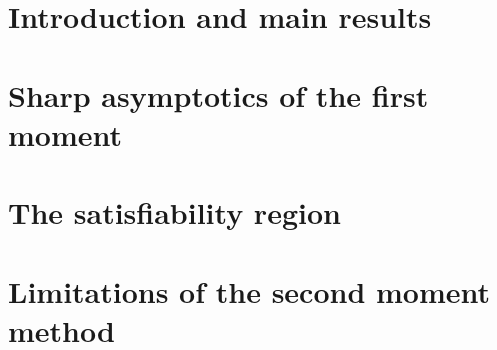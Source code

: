 \documentclass[letterpaper,11pt]{article}
\begin{document}
\setcounter{tocdepth}{2}
\tableofcontents

\section{Introduction and main results}\label{sec:intro}


\newpage
\section{Sharp asymptotics of the first moment}\label{sec:1st_moment}


\section{The satisfiability region}\label{sec:2nd_moment}


\newpage
\section{Limitations of the second moment method}\label{sec:fail_2nd_moment}


\printbibliography
\end{document}
